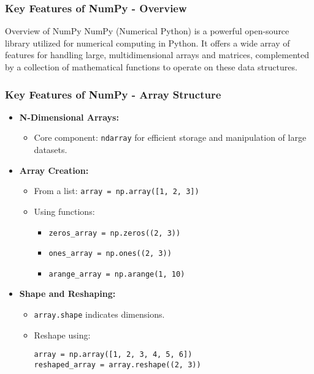 \documentclass[aspectratio=169]{beamer}
\begin{document}
\begin{frame}[fragile]
    \frametitle{Key Features of NumPy - Overview}
    \begin{block}{Overview of NumPy}
        NumPy (Numerical Python) is a powerful open-source library utilized for numerical computing in Python. 
        It offers a wide array of features for handling large, multidimensional arrays and matrices, complemented by a collection of mathematical functions to operate on these data structures.
    \end{block}
\end{frame}

\begin{frame}[fragile]
    \frametitle{Key Features of NumPy - Array Structure}
    \begin{itemize}
        \item \textbf{N-Dimensional Arrays:}
        \begin{itemize}
            \item Core component: \texttt{ndarray} for efficient storage and manipulation of large datasets.
        \end{itemize}
        \item \textbf{Array Creation:}
        \begin{itemize}
            \item From a list: \texttt{array = np.array([1, 2, 3])}
            \item Using functions:
            \begin{itemize}
                \item \texttt{zeros\_array = np.zeros((2, 3))}
                \item \texttt{ones\_array = np.ones((2, 3))}
                \item \texttt{arange\_array = np.arange(1, 10)}
            \end{itemize}
        \end{itemize}
        \item \textbf{Shape and Reshaping:}
        \begin{itemize}
            \item \texttt{array.shape} indicates dimensions.
            \item Reshape using:
            \begin{lstlisting}
array = np.array([1, 2, 3, 4, 5, 6])
reshaped_array = array.reshape((2, 3))
            \end{lstlisting}
        \end{itemize}
    \end{itemize}
\end{frame}
\end{document}

